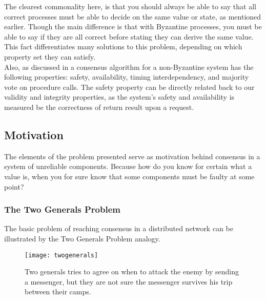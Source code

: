 The clearest commonality here, is that you should always be able to say that all correct processes must be able to decide on the same value or state, as mentioned earlier. Though the main difference is that with Byzantine processes, you must be able to say if they are all correct before stating they can derive the same value. This fact differentiates many solutions to this problem, depending on which property set they can satisfy. \\
Also, as discussed in \cite{Raft} a consensus algorithm for a non-Byzantine system has the following properties: safety, availability, timing interdependency, and majority vote on procedure calls. The safety property can be directly related back to our validity and integrity properties, as the system's safety and availability is measured be the correctness of return result upon a request.

\subsection{Motivation}
The elements of the problem presented serve as motivation behind consensus in a system of unreliable components. Because how do you know for certain what a value is, when you for sure know that some components must be faulty at some point?

\subsubsection{The Two Generals Problem}
The basic problem of reaching consensus in a distributed network can be illustrated by the Two Generals Problem analogy.

\begin{figure}[h]
	\centering
	\texttt{[image: twogenerals]}
	\caption{Two generals tries to agree on when to attack the enemy by sending a messenger, but they are not sure the messenger survives his trip between their camps.}
	\label{generals}
\end{figure}

